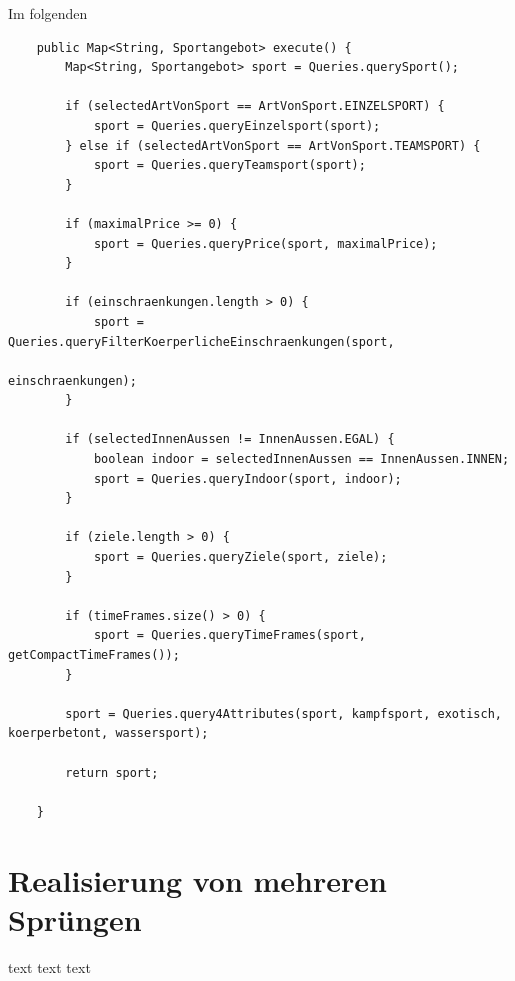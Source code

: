Im folgenden 

		


\begin{lstlisting}
    public Map<String, Sportangebot> execute() {
        Map<String, Sportangebot> sport = Queries.querySport();

        if (selectedArtVonSport == ArtVonSport.EINZELSPORT) {
            sport = Queries.queryEinzelsport(sport);
        } else if (selectedArtVonSport == ArtVonSport.TEAMSPORT) {
            sport = Queries.queryTeamsport(sport);
        }

        if (maximalPrice >= 0) {
            sport = Queries.queryPrice(sport, maximalPrice);
        }

        if (einschraenkungen.length > 0) {
            sport = Queries.queryFilterKoerperlicheEinschraenkungen(sport,
                                                                   einschraenkungen);
        }

        if (selectedInnenAussen != InnenAussen.EGAL) {
            boolean indoor = selectedInnenAussen == InnenAussen.INNEN;
            sport = Queries.queryIndoor(sport, indoor);
        }

        if (ziele.length > 0) {
            sport = Queries.queryZiele(sport, ziele);
        }

        if (timeFrames.size() > 0) {
            sport = Queries.queryTimeFrames(sport, getCompactTimeFrames());
        }

        sport = Queries.query4Attributes(sport, kampfsport, exotisch, koerperbetont, wassersport);

        return sport;

    }

\end{lstlisting}

\section{Realisierung von mehreren Sprüngen}
text text text
